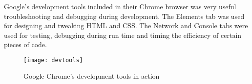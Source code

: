 Google's development tools included in their Chrome browser was very useful troubleshooting and debugging during development. The Elements tab was used for designing and tweaking HTML and CSS. The Network and Console tabs were used for testing, debugging during run time and timing the efficiency of certain pieces of code.\\

\begin{figure}[H]
\begin{center}
\texttt{[image: devtools]}
\label{fig:devtoolsf}
\caption{Google Chrome's development tools in action}
\end{center}
\end{figure}